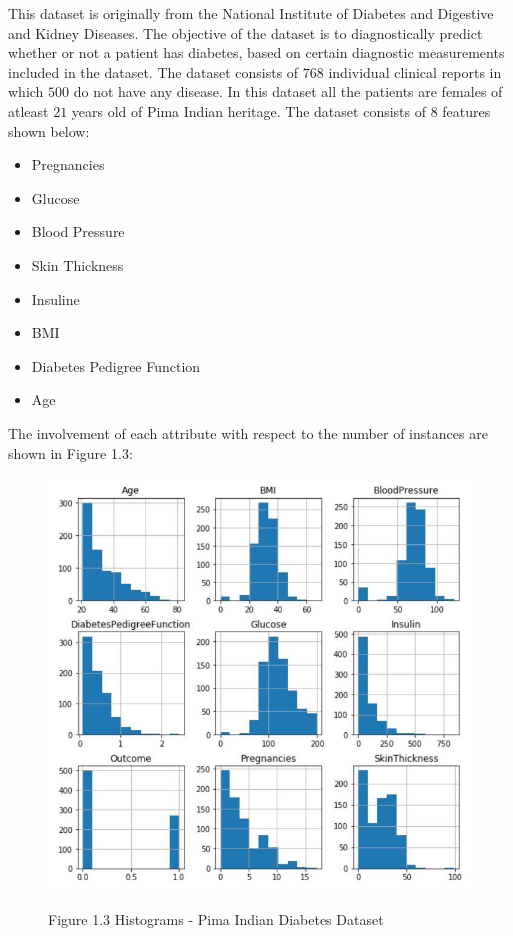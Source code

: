 \documentclass[oneside,12pt]{Classes/VTU}
\begin{document}
	This dataset is originally from the National Institute of Diabetes and Digestive and Kidney Diseases. The objective of the dataset is to diagnostically predict whether or not a patient has diabetes, based on certain diagnostic measurements included in the dataset. The dataset consists of $768$ individual clinical reports in which $500$ do not have any disease. In this dataset all the patients are females of atleast $21$ years old of Pima Indian heritage.
	The dataset consists of $8$ features shown below:
	\begin{itemize}
		\item Pregnancies
		\item Glucose
		\item Blood Pressure 
		\item Skin Thickness
		\item Insuline
		\item BMI
		\item Diabetes Pedigree Function
		\item Age
	\end{itemize}
	The involvement of each attribute with respect to the number of instances are shown in Figure 1.3:
	\linebreak
	\begin{figure}	
		\begin{center}
			\includegraphics[scale=0.6]{images/diabeteshistogram.jpeg}
		\end{center}
	
		\begin{center}
			Figure 1.3 Histograms - Pima Indian Diabetes Dataset
		\end{center}
	\end{figure}
\end{document}
